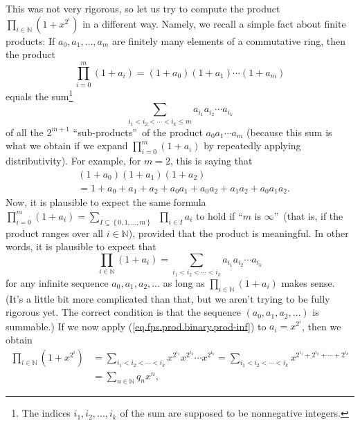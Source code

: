 This was not very rigorous, so let us try to compute the product $\prod
_{i\in\mathbb{N}}\left(  1+x^{2^{i}}\right)  $ in a different way. Namely, we
recall a simple fact about finite products: If $a_{0},a_{1},\ldots,a_{m}$ are
finitely many elements of a commutative ring, then the product
\begin{equation}
\prod_{i=0}^{m}\left(  1+a_{i}\right)  =\left(  1+a_{0}\right)  \left(
1+a_{1}\right)  \cdots\left(  1+a_{m}\right)
\label{eq.fps.prod.binary.prod-fin}%
\end{equation}
equals the sum\footnote{The indices $i_{1},i_{2},\ldots,i_{k}$ of the sum are
supposed to be nonnegative integers.}
\[
\sum_{i_{1}<i_{2}<\cdots<i_{k}\leq m}a_{i_{1}}a_{i_{2}}\cdots a_{i_{k}}%
\]
of all the $2^{m+1}$ \textquotedblleft sub-products\textquotedblright\ of the
product $a_{0}a_{1}\cdots a_{m}$ (because this sum is what we obtain if we
expand $\prod_{i=0}^{m}\left(  1+a_{i}\right)  $ by repeatedly applying
distributivity). For example, for $m=2$, this is saying that%
\begin{align*}
&  \left(  1+a_{0}\right)  \left(  1+a_{1}\right)  \left(  1+a_{2}\right) \\
&  =1+a_{0}+a_{1}+a_{2}+a_{0}a_{1}+a_{0}a_{2}+a_{1}a_{2}+a_{0}a_{1}a_{2}.
\end{align*}
Now, it is plausible to expect the same formula $\prod_{i=0}^{m}\left(
1+a_{i}\right)  =\sum_{I\subseteq\left\{  0,1,\ldots,m\right\}  }%
\ \ \prod_{i\in I}a_{i}$ to hold if \textquotedblleft$m$ is $\infty
$\textquotedblright\ (that is, if the product ranges over all $i\in\mathbb{N}%
$), provided that the product is meaningful. In other words, it is plausible
to expect that%
\begin{equation}
\prod_{i\in\mathbb{N}}\left(  1+a_{i}\right)  =\sum_{i_{1}<i_{2}<\cdots<i_{k}%
}a_{i_{1}}a_{i_{2}}\cdots a_{i_{k}} \label{eq.fps.prod.binary.prod-inf}%
\end{equation}
for any infinite sequence $a_{0},a_{1},a_{2},\ldots$ as long as $\prod
_{i\in\mathbb{N}}\left(  1+a_{i}\right)  $ makes sense. (It's a little bit
more complicated than that, but we aren't trying to be fully rigorous yet. The
correct condition is that the sequence $\left(  a_{0},a_{1},a_{2}%
,\ldots\right)  $ is summable.) If we now apply
(\ref{eq.fps.prod.binary.prod-inf}) to $a_{i}=x^{2^{i}}$, then we obtain%
\begin{align}
\prod_{i\in\mathbb{N}}\left(  1+x^{2^{i}}\right)   &  =\sum_{i_{1}%
<i_{2}<\cdots<i_{k}}x^{2^{i_{1}}}x^{2^{i_{2}}}\cdots x^{2^{i_{k}}}=\sum
_{i_{1}<i_{2}<\cdots<i_{k}}x^{2^{i_{1}}+2^{i_{2}}+\cdots+2^{i_{k}}}\nonumber\\
&  =\sum_{n\in\mathbb{N}}q_{n}x^{n}, \label{eq.fps.prod.binary.5}%
\end{align}
